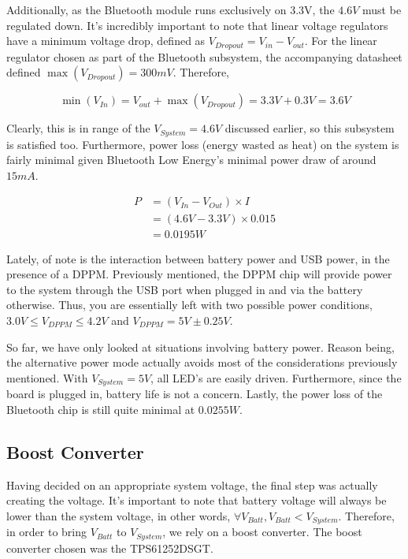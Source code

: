 \documentclass[11pt]{article}
\begin{document}
Additionally, as the Bluetooth module runs exclusively on 3.3V, the \(4.6V\) must be regulated down.\footnotemark {} It's incredibly important to note that linear voltage regulators have a minimum voltage drop, defined as \(V_{Dropout} = V_{in} - V_{out}\). For the linear regulator chosen as part of the Bluetooth subsystem, the accompanying datasheet defined \(\max(V_{Dropout}) = 300mV\). Therefore, 

$$ \min(V_{In}) = V_{out} + \max(V_{Dropout}) = 3.3V + 0.3V = 3.6V $$

Clearly, this is in range of the \(V_{System} = 4.6V\) discussed earlier, so this subsystem is satisfied too. Furthermore, power loss (energy wasted as heat) on the system is fairly minimal given Bluetooth Low Energy's minimal power draw of around \(15mA\).

\begin{equation}
\begin{aligned}
P &= (V_{In} - V_{Out}) \times I \\
&= (4.6V - 3.3V) \times 0.015 \\
&= 0.0195W 
\end{aligned}
\end{equation}


Lately, of note is the interaction between battery power and USB power, in the presence of a DPPM. Previously mentioned, the DPPM chip will provide power to the system through the USB port when plugged in and via the battery otherwise. Thus, you are essentially left with two possible power conditions, \(3.0V \le V_{DPPM} \le 4.2V\) and \(V_{DPPM} = 5V \pm 0.25V\). 

So far, we have only looked at situations involving battery power. Reason being, the alternative power mode actually avoids most of the considerations previously mentioned. With \(V_{System} = 5V\), all LED's are easily driven. Furthermore, since the board is plugged in, battery life is not a concern. Lastly, the power loss of the Bluetooth chip is still quite minimal at \(0.0255W\). 

\subsection{Boost Converter}

Having decided on an appropriate system voltage, the final step was actually creating the voltage. It's important to note that battery voltage will always be lower than the system voltage, in other words, \(\forall V_{Batt}, V_{Batt} < V_{System}\). Therefore, in order to bring \(V_{Batt}\) to \(V_{System}\), we rely on a boost converter. The boost converter chosen was the TPS61252DSGT.
\end{document}
